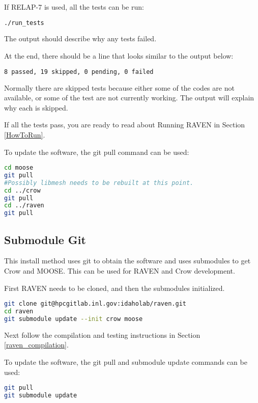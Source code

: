 If RELAP-7 is used, all the tests can be run:

\begin{lstlisting}[language=bash]
./run_tests
\end{lstlisting}


The output should describe why any tests failed.

At the end, there should be a line that looks similar to the output below:
\begin{lstlisting}[language=bash]
8 passed, 19 skipped, 0 pending, 0 failed
\end{lstlisting}

Normally there are skipped tests because either some of the codes are
not available, or some of the test are not currently working.  The
output will explain why each is skipped.

If all the tests pass, you are ready to read about Running RAVEN in
Section \ref{HowToRun}.

To update the software, the git pull command can be used:

\begin{lstlisting}[language=bash]
cd moose
git pull
#Possibly libmesh needs to be rebuilt at this point.
cd ../crow
git pull
cd ../raven
git pull
\end{lstlisting}

\subsection{Submodule Git}
\label{submodule_git}

This install method uses git to obtain the software and uses
submodules to get Crow and MOOSE.  This can be used for RAVEN and Crow
development.

First RAVEN needs to be cloned, and then the submodules initialized.

\begin{lstlisting}[language=bash]
git clone git@hpcgitlab.inl.gov:idaholab/raven.git
cd raven
git submodule update --init crow moose
\end{lstlisting}

Next follow the compilation and testing instructions in Section \ref{raven_compilation}.

To update the software, the git pull and submodule update commands can
be used:

\begin{lstlisting}[language=bash]
git pull
git submodule update
\end{lstlisting}


